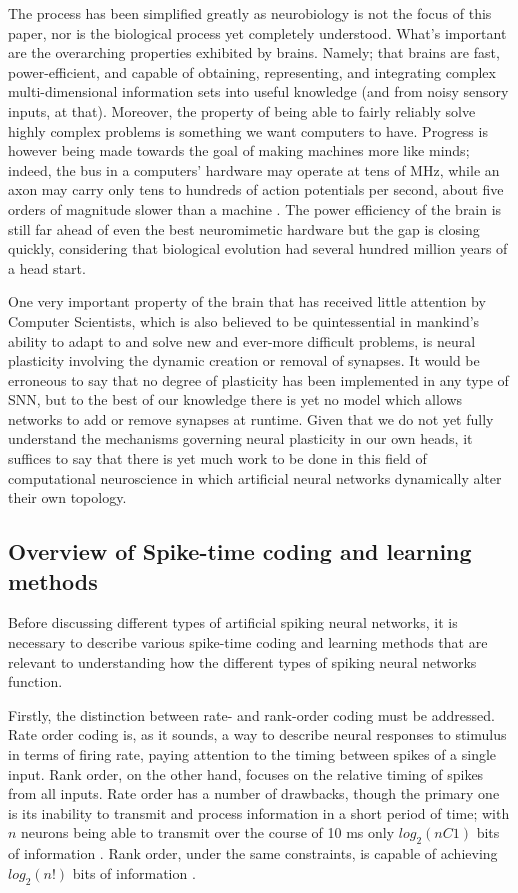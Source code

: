 \documentclass[journal]{./sty/IEEEtran}
\begin{document}
The process has been simplified greatly as neurobiology is not the focus of this paper, nor is the biological process yet completely understood. 
What's important are the overarching properties exhibited by brains. 
Namely; that brains are fast, power-efficient, and capable of obtaining, representing, and integrating complex multi-dimensional information sets into useful knowledge (and from noisy sensory inputs, at that). 
Moreover, the property of being able to fairly reliably solve highly complex problems is something we want computers to have. 
Progress is however being made towards the goal of making machines more like minds; indeed, the bus in a computers' hardware may operate at tens of MHz, while an axon may carry only tens to hundreds of action potentials per second, about five orders of magnitude slower than a machine \cite{NSE:Furber}. 
The power efficiency of the brain is still far ahead of even the best neuromimetic hardware but the gap is closing quickly, considering that biological evolution had several hundred million years of a head start. 

One very important property of the brain that has received little attention by Computer Scientists, which is also believed to be quintessential in mankind's ability to adapt to and solve new and ever-more difficult problems, is neural plasticity involving the dynamic creation or removal of synapses.
It would be erroneous to say that no degree of plasticity has been implemented in any type of SNN, but to the best of our knowledge there is yet no model which allows networks to add or remove synapses at runtime. 
Given that we do not yet fully understand the mechanisms governing neural plasticity in our own heads, it suffices to say that there is yet much work to be done in this field of computational neuroscience in which artificial neural networks dynamically alter their own topology.

\subsection{Overview of Spike-time coding and learning methods}
Before discussing different types of artificial spiking neural networks, 
it is necessary to describe various spike-time coding and learning methods 
that are relevant to understanding how the different types of spiking neural networks function.

Firstly, the distinction between rate- and rank-order coding must be addressed. 
Rate order coding is, as it sounds, a way to describe neural responses to stimulus 
in terms of firing rate, paying attention to the timing between spikes of a single input. 
Rank order, on the other hand, focuses on the relative timing of spikes from all inputs. 
Rate order has a number of drawbacks, though the primary one is its inability to transmit 
and process information in a short period of time; with \(n\) neurons being able 
to transmit over the course of 10 ms only $log_2(n C 1)$ bits of information \cite{RO:Thorpe}.
Rank order, under the same constraints, is capable of achieving $log_2(n!)$ bits of information \cite{deSNN:Kasabov}.
\end{document}
